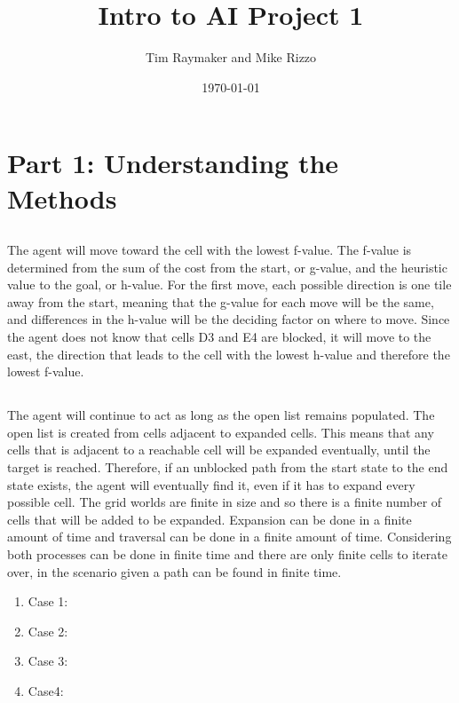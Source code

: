 \documentclass[a4paper,12pt]{article}
\begin{document}
\title{Intro to AI Project 1}
\author{Tim Raymaker and Mike Rizzo}
\date{\today}
\maketitle
\section{Part 1: Understanding the Methods}
\subsection{}
The agent will move toward the cell with the lowest f-value. The f-value is determined from the sum of the cost from the start, or g-value,  and the heuristic value to the goal, or h-value. For the first move, each possible direction is one tile away from the start, meaning that the g-value for each move will be the same, and differences in the h-value will be the deciding factor on where to move. Since the agent does not know that cells D3 and E4 are blocked, it will move to the east, the direction that leads to the cell with the lowest h-value and therefore the lowest f-value. 
\subsection{}
The agent will continue to act as long as the open list remains populated. The open list is created from cells adjacent to expanded cells. This means that any cells that is adjacent to a reachable cell will be expanded eventually, until the target is reached. Therefore, if an unblocked path from the start state to the end state exists, the agent will eventually find it, even if it has to expand every possible cell. The grid worlds are finite in size and so there is a finite number of cells that will be added to be expanded. Expansion can be done in a finite amount of time and traversal can be done in a finite amount of time. Considering both processes can be done in finite time and there are only finite cells to iterate over, in the scenario given a path can be found in finite time. 
\begin{enumerate}
	\item Case 1: 
	\item Case 2:
	\item Case 3:
	\item Case4:
\end{enumerate}
\end{document}
